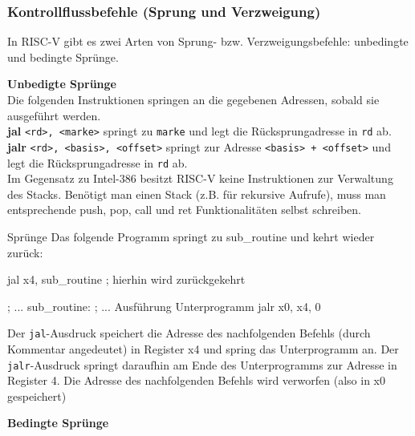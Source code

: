 \subsubsection{Kontrollflussbefehle (Sprung und Verzweigung)}
\label{manual-riscv-jump-instructions}
In RISC-V gibt es zwei Arten von Sprung- bzw. Verzweigungsbefehle: unbedingte und bedingte Sprünge.

\textbf{Unbedigte Sprünge}\\

Die folgenden Instruktionen springen an die gegebenen Adressen, sobald sie ausgeführt werden.\\
\textbf{jal} \texttt{<rd>, <marke>} springt zu \texttt{marke} und legt die Rücksprungadresse in \texttt{rd} ab.\\
\textbf{jalr} \texttt{<rd>, <basis>, <offset>} springt zur Adresse \texttt{<basis> + <offset>} und legt die Rücksprungadresse in \texttt{rd} ab.\\

Im Gegensatz zu Intel-386 besitzt RISC-V keine Instruktionen zur Verwaltung des Stacks. Benötigt man einen Stack (z.B. für rekursive Aufrufe), muss man entsprechende push, pop, call und ret Funktionalitäten selbst schreiben.

\begin{exampleblock}{Sprünge}
Das folgende Programm springt zu sub\_routine und kehrt wieder zurück:
\begin{riscv}
  jal x4, sub_routine
  ; hierhin wird zurückgekehrt

  ; ...
sub_routine:
  ; ... Ausführung Unterprogramm
  jalr x0, x4, 0
\end{riscv}
Der \texttt{jal}-Ausdruck speichert die Adresse des nachfolgenden Befehls (durch Kommentar angedeutet) in Register x4 und spring das Unterprogramm an. Der \texttt{jalr}-Ausdruck springt daraufhin am Ende des Unterprogramms zur Adresse in Register 4. Die Adresse des nachfolgenden Befehls wird verworfen (also in x0 gespeichert)
\end{exampleblock}

\textbf{Bedingte Sprünge}\\

